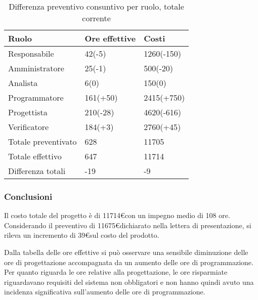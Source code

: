 	\begin{table}[H]
		\centering
	  \begin{tabular}{p{}p{}
		    							p{}}
		   \toprule Ruolo & Ore effettive & Costi \\
		   \midrule
			  Responsabile & 42(-5)  & 1260(-150) \\
			  Amministratore & 25(-1) & 500(-20) \\
			  Analista & 6(0) & 150(0) \\
			  Programmatore & 161(+50)  & 2415(+750) \\
			  Progettista & 210(-28)  & 4620(-616) \\
			  Verificatore & 184(+3)  & 2760(+45) \\
			  \hline
			  Totale preventivato & 628  & 11705 \\
			
			  Totale effettivo & 647  & 11714 \\
		
			  Differenza totali & -19  & -9 \\
			  \bottomrule
			 \end{tabular}
			 \label{tab:diffcostorendicontato}
			 \caption{Differenza preventivo consuntivo per ruolo, totale corrente}
			\end{table}
			
\subsubsection{Conclusioni}
Il costo totale del progetto è di 11714\euro con un impegno medio di 108 ore. Considerando il preventivo di 11675\euro dichiarato nella lettera di presentazione, si rileva un incremento di 39\euro sul costo del prodotto. 

Dalla tabella delle ore effettive si pu\`{o} osservare una sensibile diminuzione delle ore di progettazione accompagnata da un aumento delle ore di programmazione. Per quanto riguarda le ore relative alla progettazione, le ore risparmiate riguardavano requisiti del sistema non obbligatori e non hanno quindi avuto una incidenza significativa sull'aumento delle ore di programmazione. 		